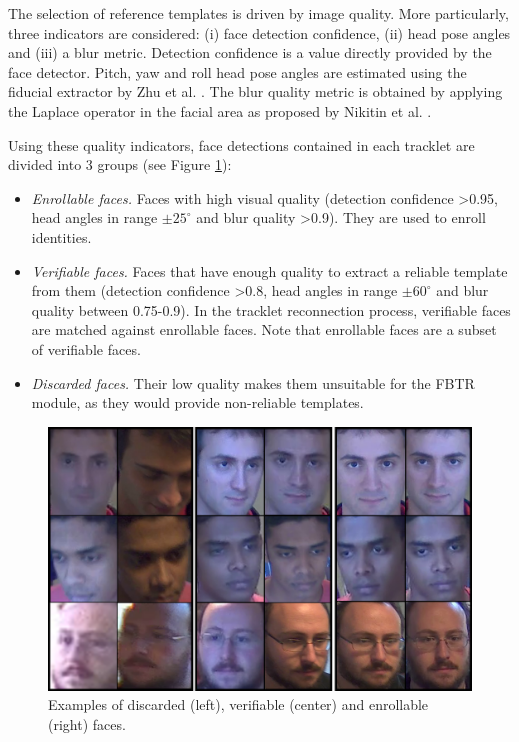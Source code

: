 The selection of reference templates is driven by image quality. More particularly, three indicators are considered: (i) face detection confidence, (ii) head pose angles and (iii) a blur metric.
Detection confidence is a value directly provided by the face detector. Pitch, yaw and roll head pose angles are estimated using the fiducial extractor by Zhu et al. \cite{zhu20173ddfa}. The blur quality metric is obtained by applying the Laplace operator in the facial area as proposed by Nikitin et al. \cite{nikitin2014facequality}.

Using these quality indicators, face detections contained in each tracklet are divided into 3 groups (see Figure \ref{fig:sample_snaps}):

\begin{itemize}
\item \textit{Enrollable faces.} Faces with high visual quality (detection confidence \textgreater0.95, head angles in range $\pm25^{\circ}$ and blur quality \textgreater0.9). They are used to enroll identities.
\item \textit{Verifiable faces.} Faces that have enough quality to extract a reliable template from them (detection confidence \textgreater0.8, head angles in range $\pm60^\circ$ and blur quality between 0.75-0.9). In the tracklet reconnection process, verifiable faces are matched against enrollable faces. Note that enrollable faces are a subset of verifiable faces.
\item \textit{Discarded faces.} Their low quality makes them unsuitable for the FBTR module, as they would provide non-reliable templates.
\end{itemize}

\begin{figure}[b!]
\centering
\includegraphics[width=\linewidth]{images/snaps.png}
\caption{Examples of discarded (left), verifiable (center) and enrollable (right) faces.}
\label{fig:sample_snaps}
\end{figure}

